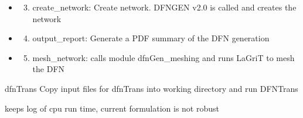 \documentclass[letterpaper,10pt,english]{sphinxmanual}
\begin{document}
\begin{fulllineitems}
\begin{fulllineitems}
\begin{description}
\begin{itemize}
\begin{enumerate}
\end{enumerate}

\item {} \begin{enumerate}
\setcounter{enumi}{2}
\item {} 
create\_network: Create network. DFNGEN v2.0 is called and creates the network

\end{enumerate}

\item {} \begin{enumerate}
\setcounter{enumi}{3}
\item {} 
output\_report: Generate a PDF summary of the DFN generation

\end{enumerate}

\item {} \begin{enumerate}
\setcounter{enumi}{4}
\item {} 
mesh\_network: calls module dfnGen\_meshing and runs LaGriT to mesh the DFN

\end{enumerate}

\end{itemize}

\end{description}

\end{fulllineitems}


\begin{fulllineitems}
\label{pydfnworks:pydfnworks.DFNWORKS.dfn_trans}
dfnTrans
Copy input files for dfnTrans into working directory and run DFNTrans

\end{fulllineitems}


\begin{fulllineitems}
\label{pydfnworks:pydfnworks.DFNWORKS.dump_time}
keeps log of cpu run time, current formulation is not robust

\end{fulllineitems}



\end{fulllineitems}
\end{document}
